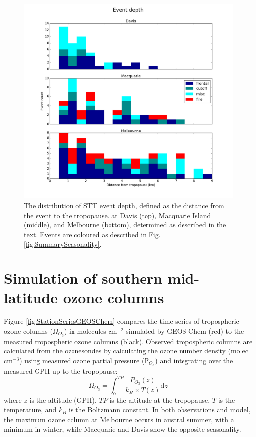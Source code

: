 \documentclass[acp, manuscript]{copernicus} %
\begin{document}
  \begin{figure}[t]
    \includegraphics[width=12cm]{figures/summary_depth.png}
    \caption{The distribution of STT event depth, defined as the distance from the event to the tropopause, at Davis (top), Macquarie Island (middle), and Melbourne (bottom), determined as described in the text.
    Events are coloured as described in Fig. \ref{fig:SummarySeasonality}.}
    \label{fig:SummaryTPDepths}    
  \end{figure}

\section{Simulation of southern mid-latitude ozone columns}

  Figure \ref{fig:StationSeriesGEOSChem} compares the time series of tropospheric ozone columns ($\Omega_{O_3}$) in molecules cm$^{-2}$ simulated by GEOS-Chem (red) to the measured tropospheric ozone columns (black).
  Observed tropospheric columns are calculated from the ozonesondes by calculating the ozone number density (molec cm$^{-3}$) using measured ozone partial pressure (P$_{O_3}$) and integrating over the measured GPH up to the tropopause:
  \begin{equation}
    \Omega_{O_3} = \int_{0}^{TP} \frac{P_{O_3}(z)}{k_B \times T(z)} \mathrm{d}z
  \end{equation}
  where $z$ is the altitude (GPH), $TP$ is the altitude at the tropopause, $T$ is the temperature, and $k_B$ is the Boltzmann constant.
  In both observations and model, the maximum ozone column at Melbourne occurs in austral summer, with a minimum in winter, while Macquarie and Davis show the opposite seasonality.
\end{document}
